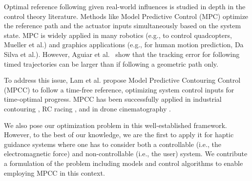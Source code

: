 Optimal reference following given real-world influences is studied in depth in the control theory literature. Methods like Model Predictive Control (MPC) \cite{Faulwasser:2009} optimize the reference path and the actuator inputs simultaneously based on the system state.
MPC is widely applied in many robotics (e.g., to control quadcopters, Mueller et al.\cite{Mueller2013}) and graphics applications (e.g., for human motion prediction, Da Silva et al.\cite{dasilva:2008:mpc}). However, Aguiar et al.~\cite{AGUIAR2008} show that the tracking error for following timed trajectories can be larger than if following a geometric path only.

To address this issue, Lam et al. propose Model Predictive Contouring Control (MPCC) \cite{lam2013model} to follow a time-free reference, optimizing system control inputs for time-optimal progress. MPCC has been successfully applied in industrial contouring \cite{lam2013model}, RC racing \cite{Liniger2014}, and in drone cinematography \cite{Naegeli:2017:MultiDroneCine}.

We also pose our optimization problem in this well-established framework. However, to the best of our knowledge, we are the first to apply it for haptic guidance systems where one has to consider both a controllable (i.e., the electromagnetic force) and non-controllable (i.e., the user) system. We contribute a formulation of the problem including models and control algorithms to enable employing MPCC in this context.
